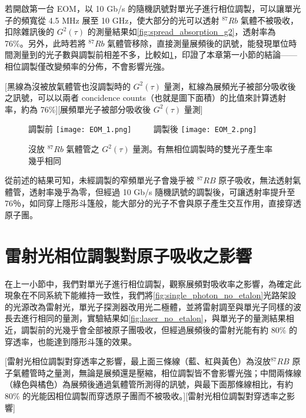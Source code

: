\documentclass[class=NCU_thesis, crop=false]{standalone}
\begin{document}
若開啟第一台 EOM，以 10 Gb/s 的隨機訊號對單光子進行相位調製，可以讓單光子的頻寬從 4.5 MHz 展至 10 GHz，使大部分的光可以透射 $^{87}Rb$ 氣體不被吸收，扣除雜訊後的 $G^2(\tau)$ 的測量結果如\cref{fig:spread_absorption_g2}，透射率為 76\%。另外，此時若將 $^{87}Rb$ 氣體管移除，直接測量展頻後的訊號，能發現單位時間測量到的光子數與調製前相差不多，比較如\cref{fig:spread_or_not}，印證了本章第一小節的結論——相位調製僅改變頻率的分佈，不會影響光強。

[黑線為沒被放氣體管也沒調製時的 $G^{2}(\tau)$ 量測，紅線為展頻光子被部分吸收後之訊號，可以以兩者 concidence counts（也就是圖下面積）的比值來計算透射率，約為 76\%][展頻單光子被部分吸收後 $G^{2}(\tau)$ 量測]

\begin{figure}[!hbt]
    \centering
    \subcaptionbox
        {調製前 
        \label{fig:subfig_fig1}}
        {\texttt{[image: EOM\_1.png]}}
    ~~~~
    \subcaptionbox
        {調製後
        \label{fig:subfig_fig2}}
        {\texttt{[image: EOM\_2.png]}}
    \caption{沒放 $^{87}Rb$ 氣體管之 $G^{2}(\tau)$ 量測。有無相位調製時的雙光子產生率幾乎相同}
    \label{fig:spread_or_not}
\end{figure}

從前述的結果可知，未經調製的窄頻單光子會幾乎被 $^{87}RB$ 原子吸收，無法透射氣體管，透射率幾乎為零，但經過 10 Gb/s 隨機訊號的調製後，可讓透射率提升至 76％，如同穿上隱形斗篷般，能大部分的光子不會與原子產生交互作用，直接穿透原子團。

\section{雷射光相位調製對原子吸收之影響}
在上一小節中，我們對單光子進行相位調製，觀察展頻對吸收率之影響，為確定此現象在不同系統下能維持一致性，我們將\cref{fig:single_photon_no_etalon}光路架設的光源改為雷射光，單光子探測器改用光二極體，並將雷射調至與單光子同樣的波長去進行相同的量測，實驗結果如\cref{fig:laser_no_etalon}，與單光子的量測結果相近，調製前的光幾乎會全部被原子團吸收，但經過展頻後的雷射光能有約 80\% 的穿透率，也能達到隱形斗篷的效果。

[雷射光相位調製對穿透率之影響，最上面三條線（藍、紅與黃色）為沒放$^{87}RB$ 原子氣體管時之量測，無論是展頻還是壓縮，相位調製皆不會影響光強；中間兩條線（綠色與橘色）為展頻後通過氣體管所測得的訊號，與最下面那條線相比，有約 80\% 的光能因相位調製而穿透原子團而不被吸收。][雷射光相位調製對穿透率之影響]
\end{document}
